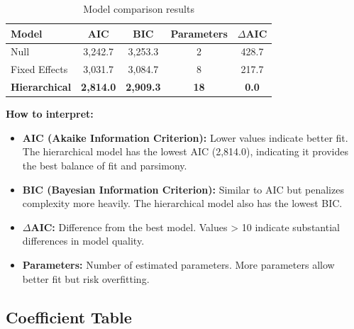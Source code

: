 \documentclass[11pt]{article}
\begin{document}
\begin{table}[h]
\centering
\begin{tabular}{lcccc}
\toprule
\textbf{Model} & \textbf{AIC} & \textbf{BIC} & \textbf{Parameters} & \textbf{$\Delta$AIC} \\
\midrule
Null & 3,242.7 & 3,253.3 & 2 & 428.7 \\
Fixed Effects & 3,031.7 & 3,084.7 & 8 & 217.7 \\
\textbf{Hierarchical} & \textbf{2,814.0} & \textbf{2,909.3} & \textbf{18} & \textbf{0.0} \\
\bottomrule
\end{tabular}
\caption{Model comparison results}
\end{table}

\textbf{How to interpret:}
\begin{itemize}
    \item \textbf{AIC (Akaike Information Criterion):} Lower values indicate better fit. The hierarchical model has the lowest AIC (2,814.0), indicating it provides the best balance of fit and parsimony.
    \item \textbf{BIC (Bayesian Information Criterion):} Similar to AIC but penalizes complexity more heavily. The hierarchical model also has the lowest BIC.
    \item \textbf{$\Delta$AIC:} Difference from the best model. Values > 10 indicate substantial differences in model quality.
    \item \textbf{Parameters:} Number of estimated parameters. More parameters allow better fit but risk overfitting.
\end{itemize}

\subsection{Coefficient Table}
\end{document}
